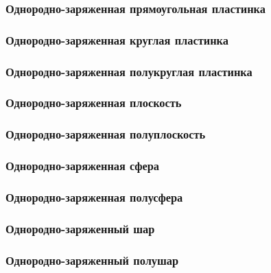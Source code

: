 \subsubsection{Однородно-заряженная прямоугольная пластинка}
\subsubsection{Однородно-заряженная круглая пластинка}
\subsubsection{Однородно-заряженная полукруглая пластинка}
\subsubsection{Однородно-заряженная плоскость}
\subsubsection{Однородно-заряженная полуплоскость}
\subsubsection{Однородно-заряженная сфера}
\subsubsection{Однородно-заряженная полусфера}
\subsubsection{Однородно-заряженный шар}
\subsubsection{Однородно-заряженный полушар}

